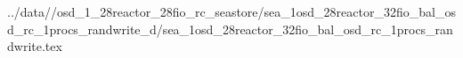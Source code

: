 ../data//osd_1_28reactor_28fio_rc_seastore/sea_1osd_28reactor_32fio_bal_osd_rc_1procs_randwrite_d/sea_1osd_28reactor_32fio_bal_osd_rc_1procs_randwrite.tex
